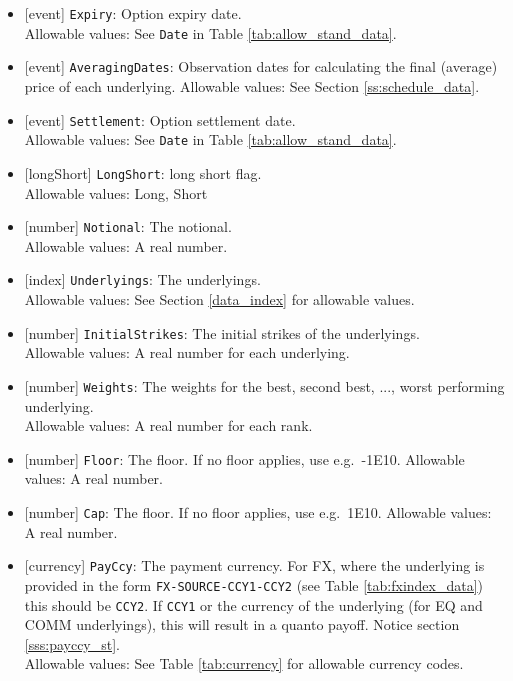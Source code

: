 \begin{itemize}
    \item{}[event] \lstinline!Expiry!: Option expiry date. \\
      Allowable values: See \lstinline!Date! in Table \ref{tab:allow_stand_data}.
    \item{}[event] \lstinline!AveragingDates!: Observation dates for calculating the final
      (average) price of each underlying.
      Allowable values: See Section \ref{ss:schedule_data}.
    \item{}[event] \lstinline!Settlement!: Option settlement date. \\
      Allowable values: See \lstinline!Date! in Table \ref{tab:allow_stand_data}.
    \item{}[longShort] \lstinline!LongShort!: long short flag. \\
      Allowable values: Long, Short
    \item{}[number] \lstinline!Notional!: The notional. \\
      Allowable values: A real number.
    \item{}[index] \lstinline!Underlyings!: The underlyings. \\
      Allowable values: See Section \ref{data_index} for allowable values.
    \item{}[number] \lstinline!InitialStrikes!: The initial strikes of the underlyings.\\
      Allowable values: A real number for each underlying.
    \item{}[number] \lstinline!Weights!: The weights for the best, second best, ..., worst performing underlying.\\
      Allowable values: A real number for each rank.
    \item{}[number] \lstinline!Floor!: The floor. If no floor applies, use e.g.\ -1E10.
      Allowable values: A real number.
    \item{}[number] \lstinline!Cap!: The floor. If no floor applies, use e.g.\ 1E10.
      Allowable values: A real number.
    \item{}[currency] \lstinline!PayCcy!: The payment currency. For FX, where the underlying is provided
    in the form \lstinline!FX-SOURCE-CCY1-CCY2! (see Table \ref{tab:fxindex_data}) this should
    be \lstinline!CCY2!. If \lstinline!CCY1! or the currency of the underlying (for EQ and
    COMM underlyings), this will result in a quanto payoff. Notice section \ref{sss:payccy_st}. \\
      Allowable values: See Table \ref{tab:currency} for allowable currency codes.
 \end{itemize}

